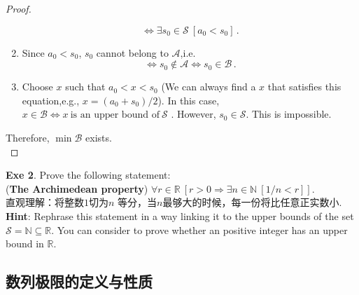\documentclass{book}
\theoremstyle{definition}
\begin{document}
\begin{proof}
\begin{enumerate}
\begin{equation}
        \Leftrightarrow \exists s_0 \in \mathcal{S}~[a_0 < s_0] \,.
    \end{equation}
    \item Since $a_0 < s_0$, $s_0$ cannot belong to $\mathcal{A}$,i.e.
    \begin{equation}
        \Leftrightarrow s_0 \not\in \mathcal{A} \Leftrightarrow s_0 \in \mathcal{B} \,.
    \end{equation}
    \item Choose $x$ such that $a_0<x<s_0$ (We can always find a $x$ that satisfies this equation,e.g., $x=(a_0+s_0)/2$). In this case, $x\in \mathcal{B} \Leftrightarrow x~\text{is an upper bound of}~ \mathcal{S}$ . However, $s_0 \in \mathcal{S}$. This is impossible. 
\end{enumerate}
Therefore, $\min \mathcal{B}$ exists.\\
\end{proof}

\noindent \textbf{Exe 2}. Prove the following statement:\\
(\textbf{The Archimedean property}) $\forall r\in\mathbb{R}~\left[r>0\Rightarrow \exists n\in\mathbb{N}~\left[1/n<r\right]\right]$.\\
直观理解：将整数$1$切为$n$ 等分，当$n$最够大的时候，每一份将比任意正实数小.\\
\textbf{Hint}: Rephrase this statement in a way linking it to the upper bounds of the set $\mathcal{S}=\mathbb{N}\subseteq\mathbb{R}$. You can consider to prove whether an positive integer has an upper bound in $\mathbb{R}$.

\subsection{数列极限的定义与性质}
\end{document}
